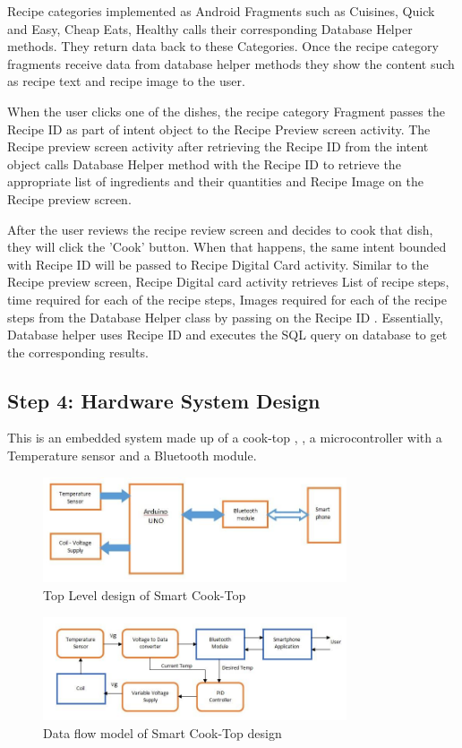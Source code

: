 Recipe categories implemented as Android Fragments such as Cuisines, Quick and Easy, Cheap Eats, Healthy calls their corresponding Database Helper methods. They return data back to these Categories. Once the recipe category fragments receive data from database helper methods they show the content such as recipe text and recipe image to the user. 

When the user clicks one of the dishes, the recipe category Fragment passes the Recipe ID as part of intent object to the Recipe Preview screen activity. The Recipe preview screen activity after retrieving the Recipe ID from the intent object calls Database Helper method with the Recipe ID to retrieve the appropriate list of ingredients and their quantities and Recipe Image on the Recipe preview screen. 

After the user reviews the recipe review screen and decides to cook that dish, they will click the 'Cook' button. When that happens, the same intent bounded with Recipe ID will be passed to Recipe Digital Card activity. Similar to the Recipe preview screen, Recipe Digital card activity retrieves List of recipe steps, time required for each of the recipe steps, Images required for each of the recipe steps from the Database Helper class by passing on the Recipe ID . Essentially, Database helper uses Recipe ID and executes the SQL query on database to get the corresponding results.

\subsection{Step 4: Hardware System Design}
This is an embedded system made up of a cook-top \cite{cook-top}, \cite{cook-top1}, a microcontroller with a Temperature sensor and a Bluetooth module.

\begin{figure}[ht!]
	\centering
	\includegraphics[width=0.8\textwidth, height=0.2\textheight]{images/hw_1.jpg}
	\caption{Top Level design of Smart Cook-Top \label{hw_1}}
\end{figure}

\begin{figure}[ht!]
	\centering
	\includegraphics[width=0.8\textwidth, height=0.2\textheight]{images/hw_2.jpg}
	\caption{Data flow model of Smart Cook-Top design \label{hw_2}}
\end{figure}

